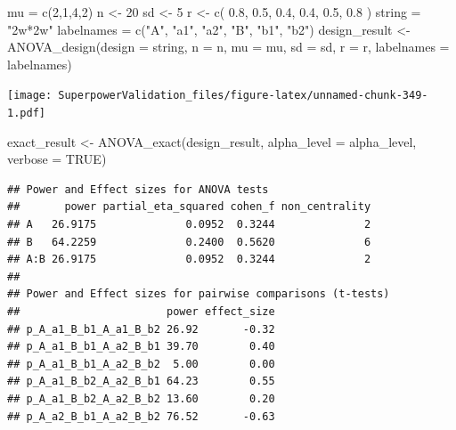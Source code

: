 \documentclass[
]{book}
\newenvironment{Shaded}{\begin{snugshade}}{\end{snugshade}}
\newcommand{\AttributeTok}[1]{\textcolor[rgb]{0.77,0.63,0.00}{#1}}
\newcommand{\ConstantTok}[1]{\textcolor[rgb]{0.00,0.00,0.00}{#1}}
\newcommand{\DecValTok}[1]{\textcolor[rgb]{0.00,0.00,0.81}{#1}}
\newcommand{\FloatTok}[1]{\textcolor[rgb]{0.00,0.00,0.81}{#1}}
\newcommand{\FunctionTok}[1]{\textcolor[rgb]{0.00,0.00,0.00}{#1}}
\newcommand{\NormalTok}[1]{#1}
\newcommand{\OtherTok}[1]{\textcolor[rgb]{0.56,0.35,0.01}{#1}}
\newcommand{\StringTok}[1]{\textcolor[rgb]{0.31,0.60,0.02}{#1}}
\begin{document}
\begin{Shaded}
\begin{Highlighting}[]
\NormalTok{mu }\OtherTok{=} \FunctionTok{c}\NormalTok{(}\DecValTok{2}\NormalTok{,}\DecValTok{1}\NormalTok{,}\DecValTok{4}\NormalTok{,}\DecValTok{2}\NormalTok{)}
\NormalTok{n }\OtherTok{\textless{}{-}} \DecValTok{20}
\NormalTok{sd }\OtherTok{\textless{}{-}} \DecValTok{5}
\NormalTok{r }\OtherTok{\textless{}{-}} \FunctionTok{c}\NormalTok{(}
  \FloatTok{0.8}\NormalTok{, }\FloatTok{0.5}\NormalTok{, }\FloatTok{0.4}\NormalTok{,}
  \FloatTok{0.4}\NormalTok{, }\FloatTok{0.5}\NormalTok{,}
  \FloatTok{0.8}
\NormalTok{)}
\NormalTok{string }\OtherTok{=} \StringTok{"2w*2w"}
\NormalTok{labelnames }\OtherTok{=} \FunctionTok{c}\NormalTok{(}\StringTok{"A"}\NormalTok{, }\StringTok{"a1"}\NormalTok{, }\StringTok{"a2"}\NormalTok{, }\StringTok{"B"}\NormalTok{, }\StringTok{"b1"}\NormalTok{, }\StringTok{"b2"}\NormalTok{)}
\NormalTok{design\_result }\OtherTok{\textless{}{-}} \FunctionTok{ANOVA\_design}\NormalTok{(}\AttributeTok{design =}\NormalTok{ string,}
                              \AttributeTok{n =}\NormalTok{ n,}
                              \AttributeTok{mu =}\NormalTok{ mu,}
                              \AttributeTok{sd =}\NormalTok{ sd,}
                              \AttributeTok{r =}\NormalTok{ r,}
                              \AttributeTok{labelnames =}\NormalTok{ labelnames)}
\end{Highlighting}
\end{Shaded}

\texttt{[image: SuperpowerValidation\_files/figure-latex/unnamed-chunk-349-1.pdf]}

\begin{Shaded}
\begin{Highlighting}[]
\NormalTok{exact\_result }\OtherTok{\textless{}{-}} \FunctionTok{ANOVA\_exact}\NormalTok{(design\_result,}
                            \AttributeTok{alpha\_level =}\NormalTok{ alpha\_level,}
                            \AttributeTok{verbose =} \ConstantTok{TRUE}\NormalTok{)}
\end{Highlighting}
\end{Shaded}

\begin{verbatim}
## Power and Effect sizes for ANOVA tests
##       power partial_eta_squared cohen_f non_centrality
## A   26.9175              0.0952  0.3244              2
## B   64.2259              0.2400  0.5620              6
## A:B 26.9175              0.0952  0.3244              2
## 
## Power and Effect sizes for pairwise comparisons (t-tests)
##                       power effect_size
## p_A_a1_B_b1_A_a1_B_b2 26.92       -0.32
## p_A_a1_B_b1_A_a2_B_b1 39.70        0.40
## p_A_a1_B_b1_A_a2_B_b2  5.00        0.00
## p_A_a1_B_b2_A_a2_B_b1 64.23        0.55
## p_A_a1_B_b2_A_a2_B_b2 13.60        0.20
## p_A_a2_B_b1_A_a2_B_b2 76.52       -0.63
\end{verbatim}
\end{document}
